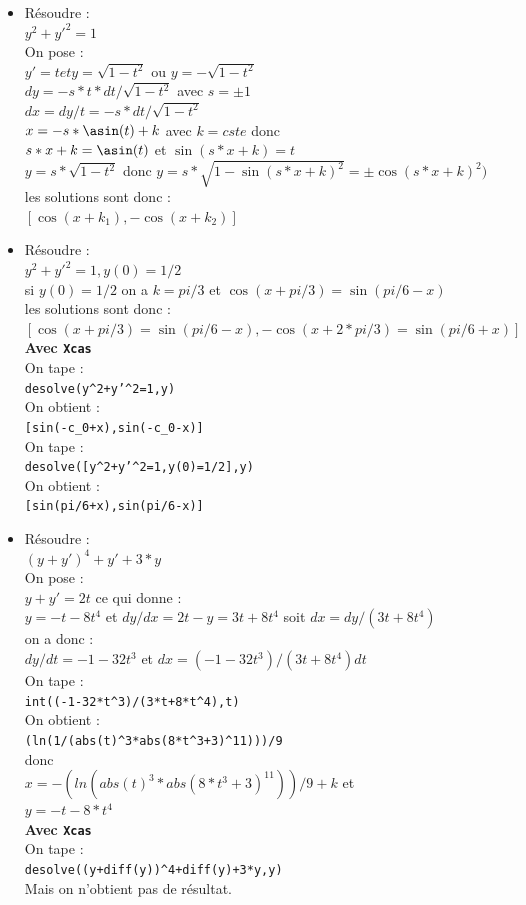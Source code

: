 \documentclass[a4paper,11pt]{book}
\begin{document}
\begin{itemize}
\item R\'esoudre :\\
$y^2+y'^2=1$\\
On pose :\\
$y'=t et y=\sqrt{1-t^2}$ ou $y=-\sqrt{1-t^2}$\\
$dy=-s*t*dt/\sqrt{1-t^2}$ avec $s=\pm 1$\\
$dx=dy/t=-s*dt/\sqrt{1-t^2}$\\
$x=-s*\asin(t)+k$ avec  $k=cste$ donc\\ 
$s*x+k=\asin(t)$ et $\sin(s*x+k)=t$\\
$y=s*\sqrt{1-t^2}$ donc $y=s*\sqrt{1-\sin(s*x+k)^2}=\pm \cos(s*x+k)^2)$\\
les solutions sont donc :\\
$ [\cos(x+k_1),-\cos(x+k_2)]$
\item R\'esoudre :\\
$y^2+y'^2=1,y(0)=1/2 $\\
si $y(0)=1/2$ on a $k=pi/3$ et $\cos(x+pi/3)=\sin(pi/6-x)$\\
les solutions sont donc :\\
 $[\cos(x+pi/3)=\sin(pi/6-x),-\cos(x+2*pi/3)=\sin(pi/6+x)]$\\
{\bf Avec {\tt Xcas}}\\
On tape :\\
{\tt desolve(y\verb|^|2+y'\verb|^|2=1,y)}\\
On obtient :\\
{\tt [sin(-c\_0+x),sin(-c\_0-x)]}\\
On tape :\\
{\tt desolve([y\verb|^|2+y'\verb|^|2=1,y(0)=1/2],y)}\\
On obtient :\\
{\tt [sin(pi/6+x),sin(pi/6-x)]}\\

\item  R\'esoudre :\\
$(y+y')^4+y'+3*y$\\
On pose :\\
$y+y'=2t$  ce qui donne :\\ 
$y=-t-8t^4$ et $dy/dx=2t-y=3t+8t^4$ soit $dx=dy/(3t+8t^4)$\\
on a donc :\\
$dy/dt=-1-32t^3$ et $dx=(-1-32t^3)/(3t+8t^4) dt$\\
On tape :\\
{\tt int((-1-32*t\verb|^|3)/(3*t+8*t\verb|^|4),t)}\\
On obtient :\\
{\tt (ln(1/(abs(t)\verb|^|3*abs(8*t\verb|^|3+3)\verb|^|11)))/9}\\
donc \\
$x=-(ln(abs(t)^3*abs(8*t^3+3)^11))/9+k$ et\\
$y=-t-8*t^4$\\
{\bf Avec {\tt Xcas}}\\
On tape :\\
{\tt desolve((y+diff(y))\verb|^|4+diff(y)+3*y,y)}\\
Mais on n'obtient pas de r\'esultat.


\end{itemize}
\end{document}
